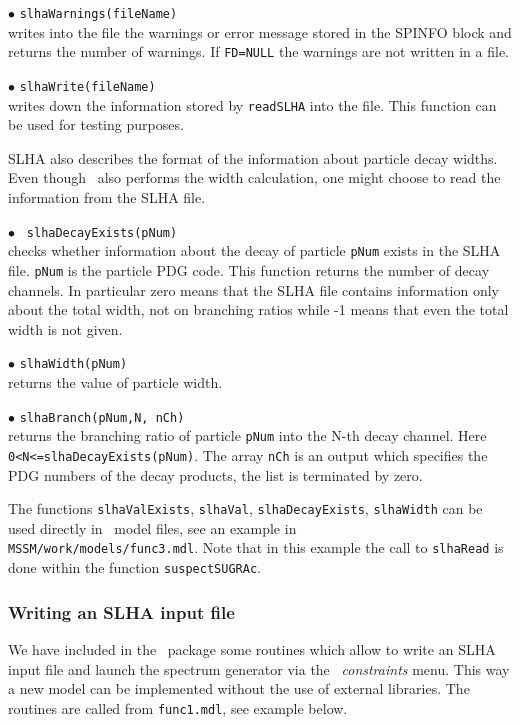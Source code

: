 \documentclass[12pt,a4paper]{article}
\begin{document}
\noindent
$\bullet$ \verb|slhaWarnings(fileName)|\\                                                                              
writes into the file the warnings or error message  stored in the SPINFO block and
returns the number of warnings. If \verb|FD=NULL| the warnings are not written in a file.

\noindent
$\bullet$ \verb|slhaWrite(fileName)|\\
 writes down the information stored by 
\verb|readSLHA| into the file. This function can be used for testing purposes. 

SLHA  also describes the format of the information about particle decay widths.  
Even though \micro\ also performs the width calculation, one might choose to read the information from the SLHA file. 
 


\noindent
$\bullet$ \verb| slhaDecayExists(pNum)|\\
checks whether information about the  decay of particle \verb|pNum| exists in the SLHA file. 
\verb|pNum| is the particle PDG code. This function returns the number 
of decay channels. 
In particular zero means that the SLHA file contains  information only about the total width, not on branching ratios while 
-1 means that even the total width is not given.

\noindent
$\bullet$ \verb|slhaWidth(pNum)|\\ returns the value of particle width.

\noindent
$\bullet$ \verb|slhaBranch(pNum,N, nCh)|\\
returns the  branching ratio of  particle \verb|pNum| into the N-th decay channel. Here\\
\noindent \verb|0<N<=slhaDecayExists(pNum)|.
The array \verb|nCh| is an output which specifies the  PDG numbers of the decay products, the list  
is terminated by zero.

The functions \verb|slhaValExists|, \verb|slhaVal|, 
\verb|slhaDecayExists|, \verb|slhaWidth| can be used directly 
in \calchep\ model files, see an example in \\
\verb|MSSM/work/models/func3.mdl|. Note that in this example the 
call to \verb|slhaRead| is done within the function \verb|suspectSUGRAc|.


\subsubsection{Writing an SLHA input file}
We have included in the \micro\ package some routines which allow to write
an SLHA input file and launch the spectrum generator via the \calchep\ 
{\it constraints} menu.  This way a new model can be implemented without the use of
external libraries. The routines are called from \verb|func1.mdl|, see example below.
\end{document}
